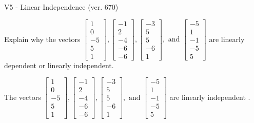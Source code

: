 \begin{exercise}
  \begin{exerciseTitle}V5 - Linear Independence (ver. 670)\end{exerciseTitle}
  \begin{exerciseStatement}
    Explain why the vectors \(\left[\begin{array}{r}
1 \\
0 \\
-5 \\
5 \\
1
\end{array}\right] , \left[\begin{array}{r}
-1 \\
2 \\
-4 \\
-6 \\
-6
\end{array}\right] , \left[\begin{array}{r}
-3 \\
5 \\
5 \\
-6 \\
1
\end{array}\right] , \text{ and } \left[\begin{array}{r}
-5 \\
1 \\
-1 \\
-5 \\
5
\end{array}\right]\) are linearly dependent or linearly independent.	


  \end{exerciseStatement}
  \begin{exerciseAnswer}
   The vectors \(\left[\begin{array}{r}
1 \\
0 \\
-5 \\
5 \\
1
\end{array}\right] , \left[\begin{array}{r}
-1 \\
2 \\
-4 \\
-6 \\
-6
\end{array}\right] , \left[\begin{array}{r}
-3 \\
5 \\
5 \\
-6 \\
1
\end{array}\right] , \text{ and } \left[\begin{array}{r}
-5 \\
1 \\
-1 \\
-5 \\
5
\end{array}\right]\) are 
  	 linearly independent  .
  


  \end{exerciseAnswer}
\end{exercise}
